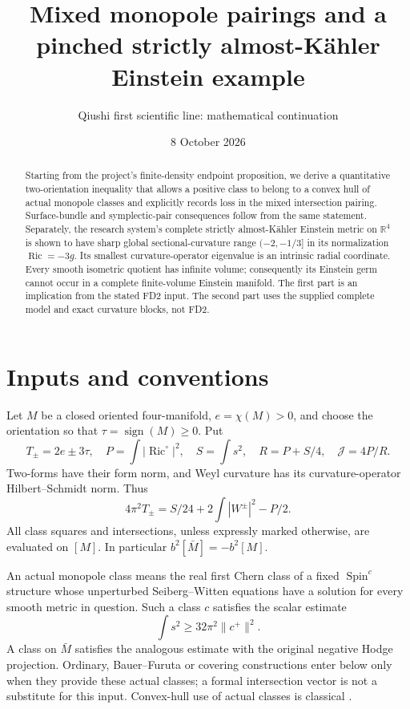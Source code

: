 \documentclass[11pt,a4paper]{article}
\title{Mixed monopole pairings and a pinched strictly almost-K\"ahler Einstein example}
\author{Qiushi first scientific line: mathematical continuation}
\date{8 October 2026}
\theoremstyle{definition}\newtheorem{assumption}[theorem]{Input}
\theoremstyle{remark}\newtheorem{remark}[theorem]{Remark}
\newcommand{\Ric}{\operatorname{Ric}}
\newcommand{\sgn}{\operatorname{sign}}
\newcommand{\cJ}{\mathcal J}
\newcommand{\R}{\mathbb R}
\numberwithin{equation}{section}
\begin{document}
\maketitle
\begin{abstract}
Starting from the project's finite-density endpoint proposition, we derive a quantitative two-orientation inequality that allows a positive class to belong to a convex hull of actual monopole classes and explicitly records loss in the mixed intersection pairing. Surface-bundle and symplectic-pair consequences follow from the same statement. Separately, the research system's complete strictly almost-K\"ahler Einstein metric on $\R^4$ is shown to have sharp global sectional-curvature range $(-2,-1/3]$ in its normalization $\Ric=-3g$. Its smallest curvature-operator eigenvalue is an intrinsic radial coordinate. Every smooth isometric quotient has infinite volume; consequently its Einstein germ cannot occur in a complete finite-volume Einstein manifold. The first part is an implication from the stated FD2 input. The second part uses the supplied complete model and exact curvature blocks, not FD2.
\end{abstract}

\section{Inputs and conventions}
Let $M$ be a closed oriented four-manifold, $e=\chi(M)>0$, and choose the orientation so that $\tau=\sgn(M)\ge0$. Put
\[
 T_\pm=2e\pm3\tau,\quad
 P=\int|\Ric^\circ|^2,\quad S=\int s^2,\quad
 R=P+S/4,\quad \cJ=4P/R.
\]
Two-forms have their form norm, and Weyl curvature has its curvature-operator Hilbert--Schmidt norm. Thus
\begin{equation}\label{cw}
4\pi^2T_\pm=S/24+2\int|W^\pm|^2-P/2.
\end{equation}
All class squares and intersections, unless expressly marked otherwise, are evaluated on $[M]$. In particular $b^2[\bar M]=-b^2[M]$.

An actual monopole class means the real first Chern class of a fixed $\operatorname{Spin}^c$ structure whose unperturbed Seiberg--Witten equations have a solution for every smooth metric in question. Such a class $c$ satisfies the scalar estimate
\begin{equation}\label{scalar}
 \int s^2\ge32\pi^2\|c^+\|^2.
\end{equation}
A class on $\bar M$ satisfies the analogous estimate with the original negative Hodge projection. Ordinary, Bauer--Furuta or covering constructions enter below only when they provide these actual classes; a formal intersection vector is not a substitute for this input. Convex-hull use of actual classes is classical \cite{LeBrun}.
\end{document}
